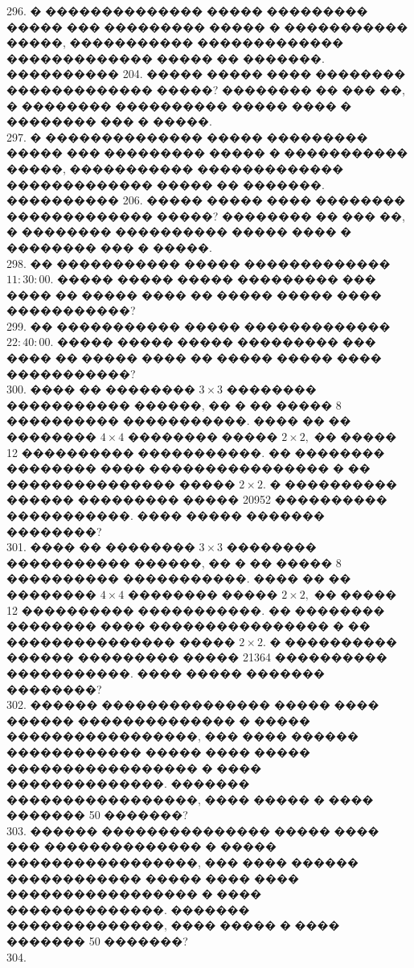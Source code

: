 \documentclass[12pt]{article}
\begin{document}
296. � �������������� ����� ��������� ����� ��� ��������� ����� � ����������� �����, ����������� ������������� ������������� ����� �� �������. ���������� 204. ����� ����� ���� �������� ������������� �����? �������� �� ��� ��, � �������� ���������� ����� ���� � �������� ��� � �����.\\
297. � �������������� ����� ��������� ����� ��� ��������� ����� � ����������� �����, ����������� ������������� ������������� ����� �� �������. ���������� 206. ����� ����� ���� �������� ������������� �����? �������� �� ��� ��, � �������� ���������� ����� ���� � �������� ��� � �����.\\
298. �� ����������� ����� ������������� $11:30:00.$ ����� ����� ����� ��������� ��� ���� �� ����� ���� �� ����� ����� ���� �����������?\\
299. �� ����������� ����� ������������� $22:40:00.$ ����� ����� ����� ��������� ��� ���� �� ����� ���� �� ����� ����� ���� �����������?\\
300. ���� �� �������� $3\times3$ �������� ����������� ������, �� � �� ����� 8 ���������� �����������. ���� �� �� �������� $4\times4$ �������� ����� $2\times2,$ �� ����� 12 ���������� �����������. �� �������� �������� ���� ���������������� � �� ��������������� ����� $2\times2.$ � ���������� ������ ��������� ����� 20952 ���������� �����������. ���� ����� ������� ��������?\\
301. ���� �� �������� $3\times3$ �������� ����������� ������, �� � �� ����� 8 ���������� �����������. ���� �� �� �������� $4\times4$ �������� ����� $2\times2,$ �� ����� 12 ���������� �����������. �� �������� �������� ���� ���������������� � �� ��������������� ����� $2\times2.$ � ���������� ������ ��������� ����� 21364 ���������� �����������. ���� ����� ������� ��������?\\
302. ������ ��������������� ����� ���� ������ �������������� � ����� �����������������, ��� ���� ������ ������������ ����� ���� ����� ����������������� � ���� ��������������. ������� �����������������, ���� ����� � ���� ������� 50 �������?\\
303. ������ ��������������� ����� ���� ��� �������������� � ����� �����������������, ��� ���� ������ ������������ ����� ���� ���� ����������������� � ���� ��������������. ������� ��������������, ���� ����� � ���� ������� 50 �������?\\
304. \begin{figure}[ht!]
\end{figure}\\
\end{document}
